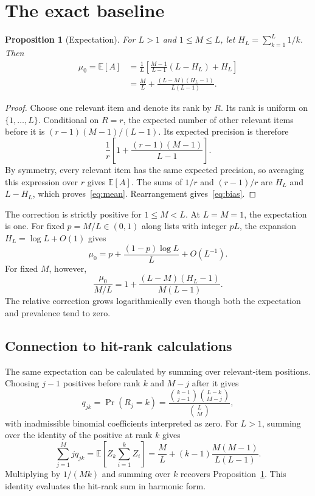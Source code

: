 \documentclass[10pt]{article}
\newtheorem{proposition}{Proposition}
\newcommand{\E}{\mathbb{E}}
\begin{document}
\section{The exact baseline}
\begin{proposition}[Expectation]\label{prop:mean}
For $L>1$ and $1\le M\le L$, let $H_L=\sum_{k=1}^L1/k$.
Then
\begin{align}
 \mu_0=\E[A]
 &=\frac1L\left[\frac{M-1}{L-1}(L-H_L)+H_L\right]\label{eq:mean}\\
 &=\frac ML+\frac{(L-M)(H_L-1)}{L(L-1)}.\label{eq:bias}
\end{align}
\end{proposition}
\begin{proof}
Choose one relevant item and denote its rank by $R$.
Its rank is uniform on $\{1,\ldots,L\}$.
Conditional on $R=r$, the expected number of other relevant items before it is $(r-1)(M-1)/(L-1)$.
Its expected precision is therefore
\[
 \frac1r\left[1+\frac{(r-1)(M-1)}{L-1}\right].
\]
By symmetry, every relevant item has the same expected precision, so averaging this expression over $r$ gives $\E[A]$.
The sums of $1/r$ and $(r-1)/r$ are $H_L$ and $L-H_L$, which proves~\eqref{eq:mean}.
Rearrangement gives~\eqref{eq:bias}.
\end{proof}
The correction is strictly positive for $1\le M<L$.
At $L=M=1$, the expectation is one.
For fixed $p=M/L\in(0,1)$ along lists with integer $pL$, the expansion $H_L=\log L+O(1)$ gives
\[
 \mu_0=p+\frac{(1-p)\log L}{L}+O(L^{-1}).
\]
For fixed $M$, however,
\begin{equation}\label{eq:relative}
 \frac{\mu_0}{M/L}=1+\frac{(L-M)(H_L-1)}{M(L-1)}.
\end{equation}
The relative correction grows logarithmically even though both the expectation and prevalence tend to zero.

\subsection{Connection to hit-rank calculations}
The same expectation can be calculated by summing over relevant-item positions.
Choosing $j-1$ positives before rank $k$ and $M-j$ after it gives
\[
 q_{jk}=\Pr(R_j=k)=\frac{\binom{k-1}{j-1}\binom{L-k}{M-j}}{\binom LM},
\]
with inadmissible binomial coefficients interpreted as zero.
For $L>1$, summing over the identity of the positive at rank $k$ gives
\[
 \sum_{j=1}^M j q_{jk}
 =\E\left[Z_k\sum_{i=1}^kZ_i\right]
 =\frac ML+(k-1)\frac{M(M-1)}{L(L-1)}.
\]
Multiplying by $1/(Mk)$ and summing over $k$ recovers Proposition~\ref{prop:mean}.
This identity evaluates the hit-rank sum in harmonic form.
\end{document}
